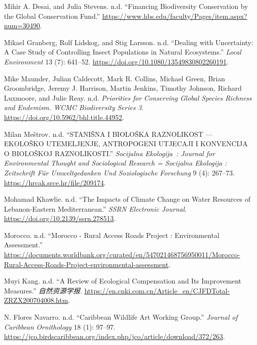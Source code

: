 \begin{CSLReferences}{1}{0}
Mihir A. Desai, and Julia Stevens. n.d. {``Financing Biodiversity
Conservation by the Global Conservation Fund.''}
\url{https://www.hbs.edu/faculty/Pages/item.aspx?num=30490}.

Mikael Granberg, Rolf Lidskog, and Stig Larsson. n.d. {``Dealing with
Uncertainty: A Case Study of Controlling Insect Populations in Natural
Ecosystems.''} \emph{Local Environment} 13 (7): 641--52.
\url{https://doi.org/10.1080/13549830802260191}.

Mike Maunder, Julian Caldecott, Mark R. Collins, Michael Green, Brian
Groombridge, Jeremy J. Harrison, Martin Jenkins, Timothy Johnson,
Richard Luxmoore, and Julie Reay. n.d. \emph{Priorities for Conserving
Global Species Richness and Endemism. WCMC Biodiversity Series 3}.
\url{https://doi.org/10.5962/bhl.title.44952}.

Milan Meštrov. n.d. {``STANIŠNA I BIOLOŠKA RAZNOLIKOST --- EKOLOŠKO
UTEMELJENJE, ANTROPOGENI UTJECAJI I KONVENCIJA O BIOLOŠKOJ
RAZNOLIKOSTI.''} \emph{Socijalna Ekologija~: Journal for Environmental
Thought and Sociological Research = Socijalna Ekologija : Zeitschrift
Für Umweltgedanken Und Soziologische Forschung} 9 (4): 267--73.
\url{https://hrcak.srce.hr/file/209174}.

Mohamad Khawlie. n.d. {``The Impacts of Climate Change on Water
Resources of Lebanon-Eastern Mediterranean.''} \emph{SSRN Electronic
Journal}. \url{https://doi.org/10.2139/ssrn.278513}.

Morocco. n.d. {``Morocco - Rural Access Roads Project : Environmental
Assessment.''}
\url{https://documents.worldbank.org/curated/en/547021468756950011/Morocco-Rural-Access-Roads-Project-environmental-assessment}.

Muyi Kang. n.d. {``A Review of Ecological Compensation and Its
Improvement Measures.''} \emph{自然资源学报}.
\url{https://en.cnki.com.cn/Article_en/CJFDTotal-ZRZX200704008.htm}.

N. Flores Navarro. n.d. {``Caribbean Wildlife Art Working Group.''}
\emph{Journal of Caribbean Ornithology} 18 (1): 97--97.
\url{https://jco.birdscaribbean.org/index.php/jco/article/download/372/263}.


\end{CSLReferences}
